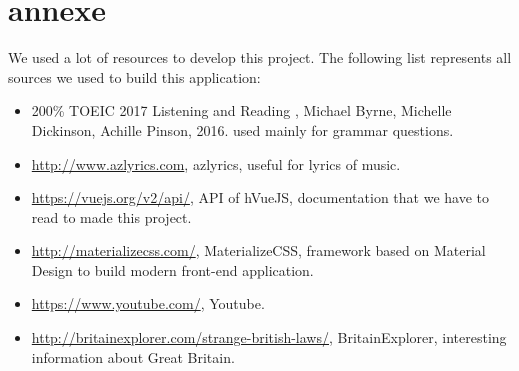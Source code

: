 \documentclass[a4paper,11pt, oneside]{book}
\begin{document}
\chapter{annexe}

We used a lot of resources to develop this project.
The following list represents all sources we used to build this application:
\begin{itemize}
	\item 200\% TOEIC 2017 Listening and Reading , Michael Byrne, Michelle Dickinson, Achille Pinson, 2016. used mainly for grammar questions.
	\item \href{http://www.azlyrics.com}{http://www.azlyrics.com}, azlyrics, useful for lyrics of music.
	\item \href{https://vuejs.org/v2/api/}{https://vuejs.org/v2/api/}, API of hVueJS, documentation that we have to read to made this project.
	\item \href{http://materializecss.com/}{http://materializecss.com/}, MaterializeCSS, framework based on Material Design to build modern front-end application.
	\item \href{https://www.youtube.com/}{https://www.youtube.com/}, Youtube.
\item \href{http://britainexplorer.com/strange-british-laws/}{http://britainexplorer.com/strange-british-laws/}, BritainExplorer, interesting information about Great Britain.
\end{itemize}
\end{document}
